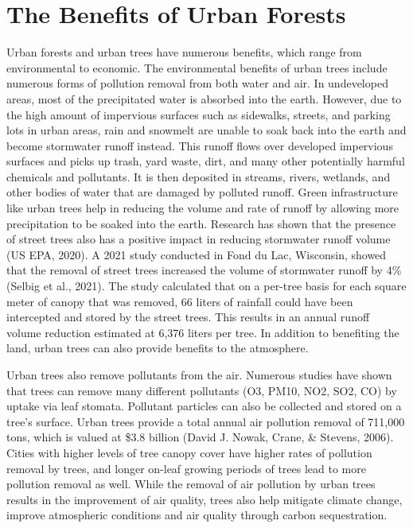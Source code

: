 \documentclass[12pt,twoside]{reedthesis}
\begin{document}
\hypertarget{the-benefits-of-urban-forests}{%
\section{The Benefits of Urban Forests}\label{the-benefits-of-urban-forests}}

Urban forests and urban trees have numerous benefits, which range from
environmental to economic. The environmental benefits of urban trees
include numerous forms of pollution removal from both water and air. In
undeveloped areas, most of the precipitated water is absorbed into the
earth. However, due to the high amount of impervious surfaces such as
sidewalks, streets, and parking lots in urban areas, rain and snowmelt
are unable to soak back into the earth and become stormwater runoff
instead. This runoff flows over developed impervious surfaces and picks
up trash, yard waste, dirt, and many other potentially harmful chemicals
and pollutants. It is then deposited in streams, rivers, wetlands, and
other bodies of water that are damaged by polluted runoff. Green
infrastructure like urban trees help in reducing the volume and rate of
runoff by allowing more precipitation to be soaked into the earth.
Research has shown that the presence of street trees also has a positive
impact in reducing stormwater runoff volume (US EPA, 2020). A 2021 study
conducted in Fond du Lac, Wisconsin, showed that the removal of street
trees increased the volume of stormwater runoff by 4\% (Selbig et al., 2021). The
study calculated that on a per-tree basis for each square meter of
canopy that was removed, 66 liters of rainfall could have been
intercepted and stored by the street trees. This results in an annual
runoff volume reduction estimated at 6,376 liters per tree. In addition
to benefiting the land, urban trees can also provide benefits to the
atmosphere.

Urban trees also remove pollutants from the air. Numerous studies have
shown that trees can remove many different pollutants (O3, PM10, NO2,
SO2, CO) by uptake via leaf stomata. Pollutant particles can also be
collected and stored on a tree's surface. Urban trees provide a total
annual air pollution removal of 711,000 tons, which is valued at \$3.8
billion (David J. Nowak, Crane, \& Stevens, 2006). Cities with higher levels of tree canopy cover
have higher rates of pollution removal by trees, and longer on-leaf
growing periods of trees lead to more pollution removal as well. While
the removal of air pollution by urban trees results in the improvement
of air quality, trees also help mitigate climate change, improve
atmospheric conditions and air quality through carbon sequestration.
\end{document}
